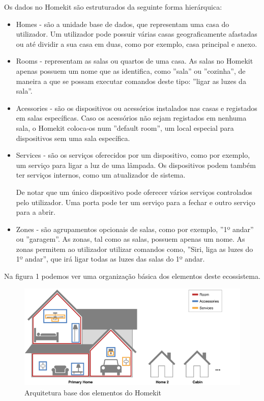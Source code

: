 Os dados no Homekit são estruturados da seguinte forma hierárquica:
\begin{itemize}
    \item Homes - são a unidade base de dados, que representam uma casa do utilizador. Um utilizador pode possuir várias casas geograficamente afastadas ou até dividir a sua casa em duas, como por exemplo, casa principal e anexo.

    \item Rooms - representam as salas ou quartos de uma casa. As salas no Homekit apenas possuem um nome que as identifica, como ''sala'' ou ''cozinha'', de maneira a que se possam executar comandos deste tipo: ''ligar as luzes da sala''.

    \item Acessories - são os dispositivos ou acessórios instalados nas casas e registados em salas específicas. Caso os acessórios não sejam registados em nenhuma sala, o Homekit coloca-os num ''default room'', um local especial para dispositivos sem uma sala específica.

    \item Services - são os serviços oferecidos por um dispositivo, como por exemplo, um serviço para ligar a luz de uma lâmpada. Os dispositivos podem também ter serviços internos, como um atualizador de sistema.

    De notar que um único dispositivo pode oferecer vários serviços controlados pelo utilizador. Uma porta pode ter um serviço para a fechar e outro serviço para a abrir.

    \item Zones - são agrupamentos opcionais de salas, como por exemplo, ''1º andar'' ou ''garagem''. As zonas, tal como as salas, possuem apenas um nome. As zonas permitem ao utilizador utilizar comandos como, ''Siri, liga as luzes do 1º andar'', que irá ligar todas as luzes das salas do 1º andar.
\end{itemize}

Na figura 1 podemos ver uma organização básica dos elementos deste ecossistema.

\begin{figure}[H]
  \centering
        \includegraphics[scale=0.56]{img/homekit-layout.png}
  \caption{Arquitetura base dos elementos do Homekit}
\end{figure}

